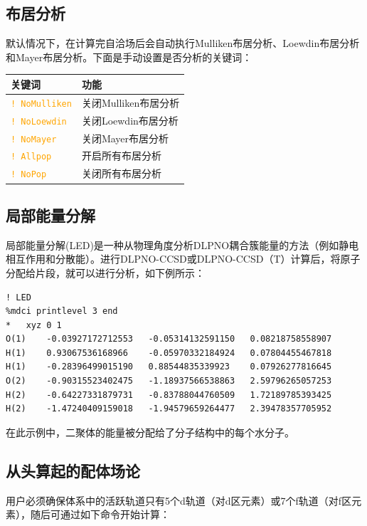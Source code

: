 \documentclass{ctexart}
\newcommand{\cmd}[1]{\textcolor{orange}{ \texttt{#1} }}
\begin{document}
	\subsection{布居分析} 
	
	默认情况下，在计算完自洽场后会自动执行Mulliken布居分析、Loewdin布居分析和Mayer布居分析。下面是手动设置是否分析的关键词：
	
	\begin{table}[H]
		\centering
		\begin{tabular}{ll}
			\toprule
			\textbf{关键词 }           & \textbf{功能}             \\
			\midrule
			 \cmd{! NoMulliken}  & 关闭Mulliken布居分析 \\
			 \cmd{! NoLoewdin}   & 关闭Loewdin布居分析  \\
			 \cmd{! NoMayer}     & 关闭Mayer布居分析  \\
			 \cmd{! Allpop}      & 开启所有布居分析       \\
			 \cmd{! NoPop}       & 关闭所有布居分析      \\
			 \bottomrule
		\end{tabular}
	\end{table}
	
	\subsection{局部能量分解} 
	
	局部能量分解(LED)是一种从物理角度分析DLPNO耦合簇能量的方法（例如静电相互作用和分散能）。进行DLPNO-CCSD或DLPNO-CCSD（T）计算后，将原子分配给片段，就可以进行分析，如下例所示：
	
	\begin{lstlisting}
! LED
%mdci printlevel 3 end
*	xyz 0 1
O(1)	-0.03927172712553	-0.05314132591150	0.08218758558907
H(1)	0.93067536168966	-0.05970332184924	0.07804455467818
H(1)	-0.28396499015190	0.88544835339923	0.07926277816645
O(2)	-0.90315523402475	-1.18937566538863	2.59796265057253
H(2)	-0.64227331879731	-0.83788044760509	1.72189785393425
H(2)	-1.47240409159018	-1.94579659264477	2.39478357705952
	\end{lstlisting}
	
	在此示例中，二聚体的能量被分配给了分子结构中的每个水分子。
	
	\subsection{从头算起的配体场论} 
	
	用户必须确保体系中的活跃轨道只有5个d轨道（对d区元素）或7个f轨道（对f区元素），随后可通过如下命令开始计算：
	
\end{document}
